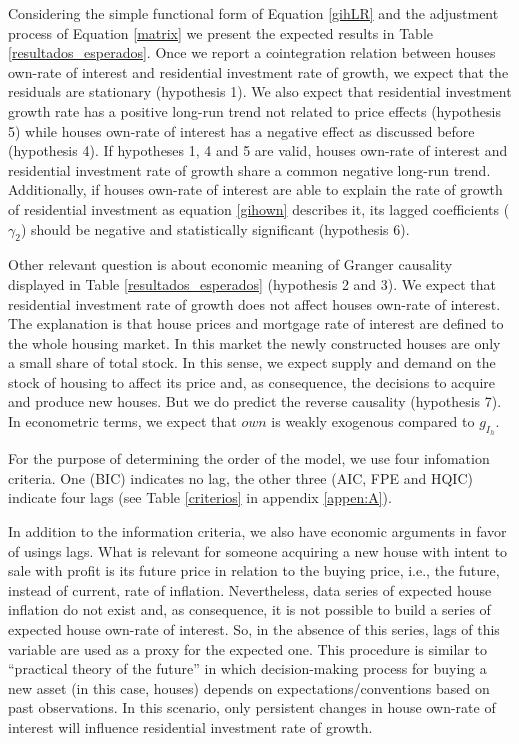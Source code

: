 \documentclass[12pt, a4paper]{article}
\begin{document}
Considering the simple functional form of Equation \ref{gihLR} and the adjustment process of Equation \ref{matrix} we present the expected results in Table \ref{resultados_esperados}.
Once we report a cointegration relation between houses own-rate of interest and residential investment rate of growth, we expect that the residuals are stationary (hypothesis 1).
We also expect that residential investment growth rate has a positive long-run trend not related to price effects (hypothesis 5) while houses own-rate of interest has a negative effect as discussed before (hypothesis 4).
If  hypotheses 1, 4 and 5 are valid, houses own-rate of interest and residential investment rate of growth share a common negative long-run trend.
Additionally, if houses own-rate of interest are able to explain the rate of growth of residential investment as equation \ref{gihown} describes it, its lagged coefficients (\(\gamma_{2}\)) should be negative and statistically significant (hypothesis 6).






Other relevant question is about economic meaning of Granger causality displayed in Table \ref{resultados_esperados} (hypothesis 2 and 3).
We expect that residential investment rate of growth does not affect  houses own-rate of interest.
The explanation is that house prices and mortgage rate of interest are defined to the whole housing market.
In this market the newly constructed houses are only a small share of total stock.
In this sense, we expect supply and demand on the stock of housing to affect its price and, as consequence,  the decisions to acquire and produce new houses.
But we do predict the reverse causality (hypothesis 7).
In econometric terms, we expect that \(own\) is weakly exogenous compared to \(g_{I_{h}}\).

For the purpose of determining the order of the model, we use four infomation criteria.
One (BIC) indicates no lag, the other three (AIC, FPE and HQIC) indicate four lags (see Table \ref{criterios} in appendix \ref{appen:A}).

In addition to the information criteria, we also have economic arguments in favor of usings lags.
What is relevant for someone acquiring a new house with intent to sale with profit is its future price in relation to the buying price, i.e., the future, instead of current, rate of inflation.
Nevertheless, data series of expected house inflation do not exist and, as consequence, it is not possible to build a series of expected house own-rate of interest.
So, in the absence of this series, lags of this variable are used as a proxy for the expected one.
This procedure is similar to \textcite{keynes_general_1937}  ``practical theory of the future'' in which decision-making process for buying a new asset (in this case, houses) depends on expectations/conventions based on past observations.
In this scenario, only persistent changes in house own-rate of interest will influence residential investment rate of growth.
\end{document}
